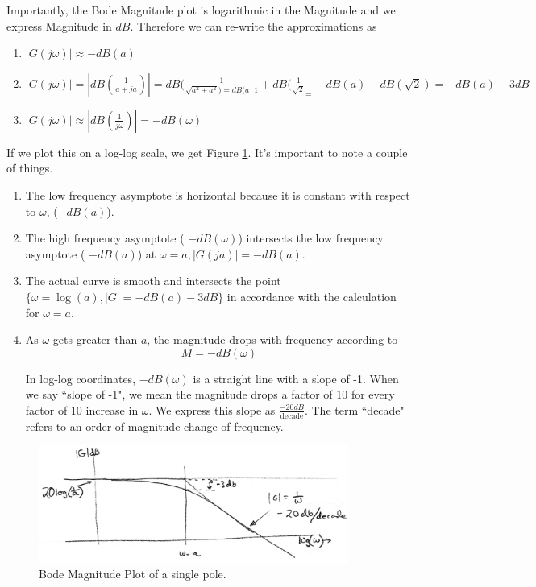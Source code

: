 Importantly, the Bode Magnitude plot is logarithmic in the Magnitude and we express Magnitude in $dB$.
Therefore we can re-write the  approximations  as

\begin{enumerate}
  \item  $|G(j\omega)| \approx -dB(a)$
  \item  $|G(j\omega)| = \left | dB(\frac{1}{a+ja})    \right | = dB(\frac{1}{\sqrt{a^2+a^2}) =
    dB(a^-1}+dB(\frac{1}{\sqrt{2}}_ = -dB(a) - dB(\sqrt{2}) = -dB(a) -3dB$
  \item  $|G(j\omega)| \approx \left | dB(\frac{1}{j\omega}) \right | = -dB(\omega)$
\end{enumerate}

If we plot this on a log-log scale, we get Figure \ref{BodeMagOnePole}.
It's important to note a couple of things.

\begin{enumerate}
  \item The low frequency asymptote is horizontal because it is constant with respect to $\omega$, ($-dB(a)$).
  \item The high frequency asymptote ( $-dB(\omega)$) intersects
         the low frequency asymptote ( $-dB(a)$) at $\omega = a, |G(ja)| = -dB(a)$.
  \item The actual curve is smooth and intersects the point
  $\{\omega=\log(a), |G| = -dB(a)-3dB\}$ in accordance with
  the calculation for  $\omega = a$.

  \item As $\omega$ gets greater than $a$, the magnitude drops with frequency according to
  $$ M = -dB(\omega) $$

In log-log coordinates, $-dB(\omega)$ is a straight line with a slope of -1.  When we say ``slope of -1", we mean the magnitude drops a factor of 10 for every factor of 10 increase in $\omega$.   We express this slope as $\frac{-20dB}{\mathrm{decade}}$. The term ``decade" refers to an order of magnitude change of frequency.

\end{enumerate}


\begin{figure}\centering
\includegraphics[width=4.0in]{figs05/00734a.png}
\caption{Bode Magnitude Plot of a single pole.}\label{BodeMagOnePole}
\end{figure}


